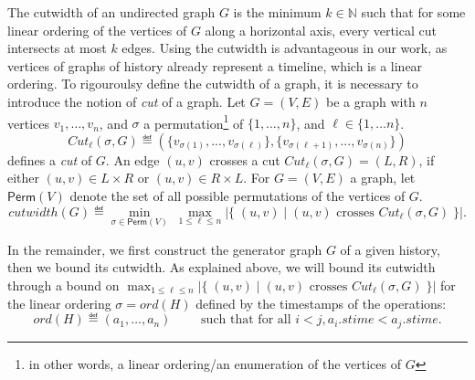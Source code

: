 The cutwidth of an undirected graph $G$ is the minimum \mbox{$k \in \mathbb{N}$} such that for some linear ordering of the vertices of ${G}$ along a horizontal axis, every vertical cut intersects at most $k$ edges. 
Using the cutwidth is advantageous in our work, as vertices of graphs of history already represent a timeline, which is a linear ordering. 
To rigouroulsy define the cutwidth of a graph, it is necessary to introduce the notion of \textsl{cut} of a graph. 
Let $G=(V,E)$ be a graph with $n$ vertices $v_1,\ldots,v_n$, and $\sigma$ a permutation\footnote{in other words, a linear ordering/an enumeration of the vertices of $G$} of $\{1,\ldots,n\}$, and $\ell\in\{1,\ldots n\}$.
$$
Cut_\ell(\sigma,G)\eqdef (\{v_{\sigma(1)},...,v_{\sigma(\ell)}\},\{v_{\sigma(\ell+1)},...,v_{\sigma(n)}\})
$$
defines a \textsl{cut} of $G$. An edge $(u,v)$ crosses a cut $Cut_\ell(\sigma,G)=(L,R)$, if either $(u,v) \in L\times R$ or $(u,v)\in R\times L$. 
For $G=(V,E)$ a graph, let $\mathsf{Perm}(V)$ denote the set of all possible permutations of the vertices of $G$. 
$$
cutwidth(G) \eqdef \displaystyle \min_{\sigma\in \mathsf{Perm}(V)}\; \max_{1\leq\ell\leq n} \big|\big\{\;
(u,v)\;\big| \; (u,v) \mbox{ crosses } Cut_\ell(\sigma,G)
\;\big\}\big|.
$$

In the remainder, we first construct the generator graph $G$ of a given history, then we bound its cutwidth. As explained above, we will bound its cutwidth through a bound on $\max_{1\leq\ell\leq n} \big|\big\{\;
(u,v)\;\big| \; (u,v) \mbox{ crosses } Cut_\ell(\sigma,G)
\;\big\}\big|$ for the linear ordering $\sigma=ord(H)$ defined by the timestamps of the operations:
$$
ord(H) \eqdef (a_1,\ldots,a_n) \qquad\mbox{ such that for all } i<j, a_i.stime <a_j.stime.
$$
